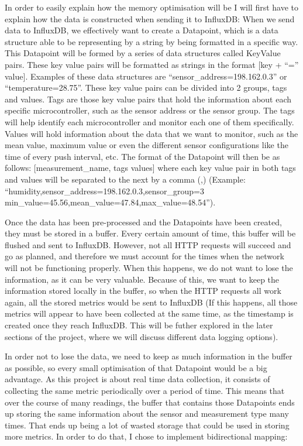 \documentclass[12pt]{article}
\begin{document}
In order to easily explain how the memory optimisation will be I will first have to explain how the data is constructed when sending it to InfluxDB: When we send data to InfluxDB, we effectively want to create a Datapoint, which is a data structure able to be representing by a string by being formatted in a specific way. This Datapoint will be formed by a series of data structures called KeyValue pairs. These key value pairs will be formatted as strings in the format [key + ``='' value]. Examples of these data structures are ``sensor\_address=198.162.0.3'' or ``temperature=28.75''. These key value pairs can be divided into 2 groups, tags and values. Tags are those key value pairs that hold the information about each specific microcontroller, such as the sensor address or the sensor group. The tags will help identify each microcontroller and monitor each one of them specifically. Values will hold information about the data that we want to monitor, such as the mean value, maximum value or even the different sensor configurations like the time of every push interval, etc. The format of the Datapoint will then be as follows: [measurement\_name, tags values] where each key value pair in both tags and values will be separated to the next by a comma (,) (Example: ``humidity,sensor\_address=198.162.0.3,sensor\_group=3 min\_value=45.56,mean\_value=47.84,max\_value=48.54'').\par

Once the data has been pre-processed and the Datapoints have been created, they must be stored in a buffer. Every certain amount of time, this buffer will be flushed and sent to InfluxDB. However, not all HTTP requests will succeed and go as planned, and therefore we must account for the times when the network will not be functioning properly. When this happens, we do not want to lose the information, as it can be very valuable. Because of this, we want to keep the information stored locally in the buffer, so when the HTTP requests all work again, all the stored metrics would be sent to InfluxDB (If this happens, all those metrics will appear to have been collected at the same time, as the timestamp is created once they reach InfluxDB. This will be futher explored in the later sections of the project, where we will discuss different data logging options).\par

In order not to lose the data, we need to keep as much information in the buffer as possible, so every small optimisation of that Datapoint would be a big advantage. As this project is about real time data collection, it consists of collecting the same metric periodically over a period of time. This means that over the course of many readings, the buffer that contains those Datapoints ends up storing the same information about the sensor and measurement type many times. That ends up being a lot of wasted storage that could be used in storing more metrics. In order to do that, I chose to implement bidirectional mapping: \par
\end{document}
